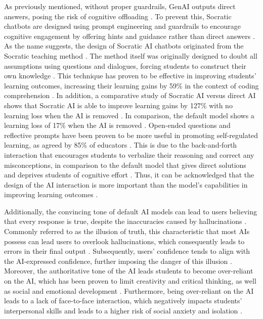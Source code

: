 \documentclass{article}
\begin{document}
As previously mentioned, without proper guardrails, 
GenAI outputs direct answers, posing the risk of cognitive offloading \cite{xia2025systematic, qian2025pedagogical}. 
To prevent this, Socratic chatbots are designed using prompt engineering and guardrails 
to encourage cognitive engagement 
by offering hints and guidance rather than direct answers \cite{Yazici2024,Hilliger2025}.
As the name suggests, the design of Socratic AI chatbots originated from the Socratic teaching method \cite{Jabbour2025}. 
The method itself was originally designed to doubt all assumptions using questions and dialogues, 
forcing students to construct their own knowledge \cite{Wazan2026}. 
This technique has proven to be effective in improving students' learning outcomes, 
increasing their learning gains by 59\% in the context of coding comprehension \cite{Tamang2021}. 
In addition, a comparative study of Socratic AI versus direct AI shows that 
Socratic AI is able to improve learning gains by 127\% with no learning loss when the AI is removed \cite{Bastani2025}.
In comparison, the default model shows a learning loss of 17\% when the AI is removed \cite{Bastani2025}.
Open-ended questions and reflective prompts have been proven to be more useful in 
promoting self-regulated learning, as agreed by 85\% of educators \cite{Hilliger2026}.
This is due to the back-and-forth interaction that encourages students to 
verbalize their reasoning and correct any misconceptions, in comparison 
to the default model that gives direct solutions and deprives students of cognitive effort \cite{Ding2024}.
Thus, it can be acknowledged that the design of the AI interaction is more important 
than the model's capabilities in improving learning outcomes \cite{Bastani2025}. 

Additionally, the convincing tone of default AI models can lead to 
users believing that every response is true, 
despite the inaccuracies caused by hallucinations \cite{sallai2024approach,Jivtode2024}. 
Commonly referred to as the illusion of truth, this characteristic that most AIs possess 
can lead users to overlook hallucinations, which consequently leads to 
errors in their final output \cite{sallai2024approach,Loughlin2026}.
Subsequently, users' confidence tends to align with the AI-expressed confidence, 
further imposing the danger of this illusion \cite{Li2025}. 
Moreover, the authoritative tone of the AI leads students to become over-reliant on the AI, 
which has been proven to limit creativity and critical thinking, as well as 
social and emotional development \cite{KimetAl2026, Li2025}. 
Furthermore, being over-reliant on the AI leads to a lack 
of face-to-face interaction, which negatively impacts students' interpersonal skills and 
leads to a higher risk of social anxiety and isolation \cite{KlimovaPikhart2025}.
\end{document}
